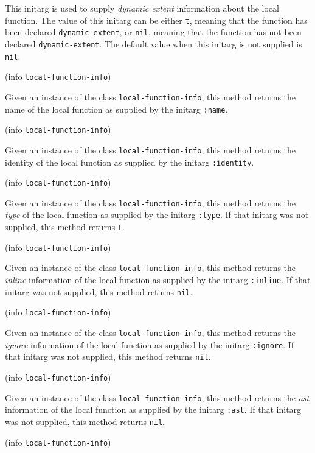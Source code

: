 
This initarg is used to supply \emph{dynamic extent} information about
the local function.  The value of this initarg can be either
\texttt{t}, meaning that the function has been declared
\texttt{dynamic-extent}, or \texttt{nil}, meaning that the function
has not been declared \texttt{dynamic-extent}.  The default value when
this initarg is not supplied is \texttt{nil}. 

 {(info {\tt local-function-info})}

Given an instance of the class \texttt{local-function-info}, this
method returns the name of the local function as supplied by the
initarg \texttt{:name}.

 {(info {\tt local-function-info})}

Given an instance of the class \texttt{local-function-info}, this
method returns the identity of the local function as supplied by the
initarg \texttt{:identity}.

 {(info {\tt local-function-info})}

Given an instance of the class \texttt{local-function-info}, this
method returns the \emph{type} of the local function as supplied by the
initarg \texttt{:type}.  If that initarg was not supplied, this method
returns \texttt{t}.

 {(info {\tt local-function-info})}

Given an instance of the class \texttt{local-function-info}, this
method returns the \emph{inline} information of the local function as
supplied by the initarg \texttt{:inline}.  If that initarg was not
supplied, this method returns \texttt{nil}.

 {(info {\tt local-function-info})}

Given an instance of the class \texttt{local-function-info}, this
method returns the \emph{ignore} information of the local function as
supplied by the initarg \texttt{:ignore}.  If that initarg was not
supplied, this method returns \texttt{nil}.

 {(info {\tt local-function-info})}

Given an instance of the class \texttt{local-function-info}, this method returns the \emph{ast} information of the local function as supplied by the initarg \texttt{:ast}. If that initarg was not supplied, this method returns \texttt{nil}.

 {(info {\tt local-function-info})}

